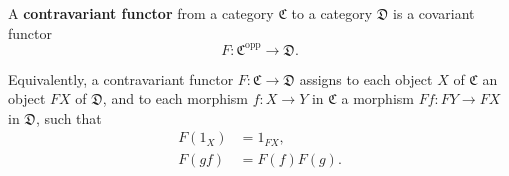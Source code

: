 A \textbf{contravariant functor} from a category $\mathfrak{C}$ to a category $\mathfrak{D}$ is a covariant functor
$$F: \mathfrak{C}^{\text{opp}} \to \mathfrak{D}.$$

Equivalently, a contravariant functor $F: \mathfrak{C} \to \mathfrak{D}$ assigns to each object $X$ of $\mathfrak{C}$ an object $FX$ of $\mathfrak{D}$, and to each morphism $f: X \to Y$ in $\mathfrak{C}$ a morphism $Ff: FY \to FX$ in $\mathfrak{D}$, such that
\begin{align}
F(1_X) &= 1_{FX}, \\
F(gf) &= F(f) F(g).
\end{align}
